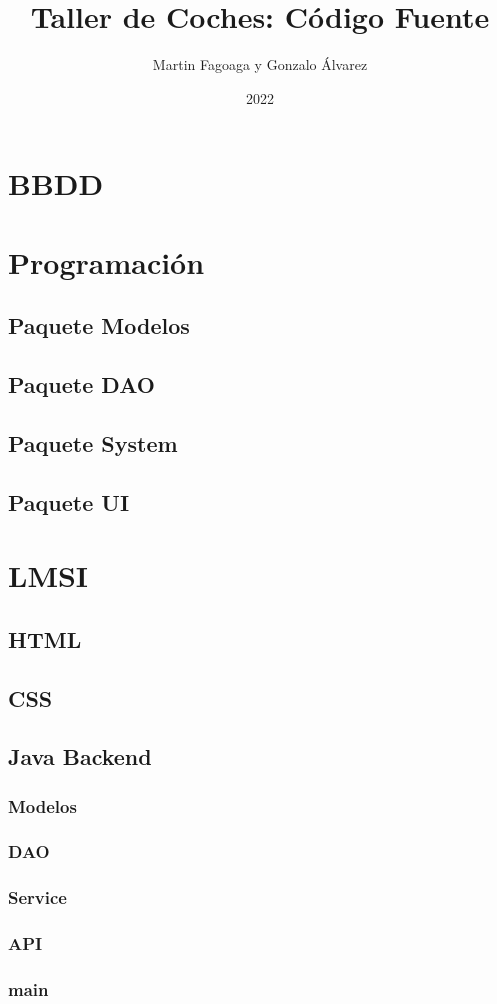 \documentclass{article}
\title{Taller de Coches: Código Fuente}
\author{Martin Fagoaga y Gonzalo Álvarez}
\date{2022}
\begin{document}
\maketitle 
\clearpage
\lstlistoflistings
\clearpage
\appendix
\begin{appendices}
  \section{BBDD}\label{appendix:BBDD}
  
  \section{Programación}\label{appendix:programacion}
  \subsection{Paquete Modelos}
  
  \subsection{Paquete DAO}
  
  \subsection{Paquete System}
  
  \subsection{Paquete UI}
  
  \section{LMSI}\label{appendix:LMSI}
  \subsection{HTML}
  
  \subsection{CSS}
  
  \subsection{Java Backend}
  \subsubsection{Modelos}
  
  \subsubsection{DAO}
  
  \subsubsection{Service}
  
  \subsubsection{API}
  
  \subsubsection{main}
  
\end{appendices}
\end{document}
